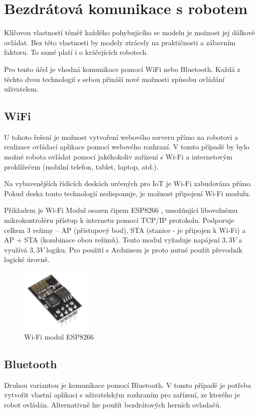 \section{Bezdrátová komunikace s robotem}
Klíčovou vlastností téměř každého pohybujícího se modelu je možnost jej dálkově ovládat. Bez této vlastnosti by modely ztrácely na praktičnosti a zábavním faktoru. To samé platí i o kráčejících robotech.

Pro tento účel je vhodná komunikace pomocí WiFi nebo Bluetooth. Každá z těchto dvou technologií s sebou přináší nové možnosti způsobu ovládání uživatelem.

\subsection*{WiFi}
U tohoto řešení je možnost vytvoření webového serveru přímo na robotovi a realizace ovládací aplikace pomocí webového rozhraní. V tomto případě by bylo možné robota ovládat pomocí jakéhokoliv zařízení s Wi-Fi a internetovým prohlížečem (mobilní telefon, tablet, laptop, atd.).

Na vybavenějších řídících deskách určených pro IoT je Wi-Fi zabudována přímo. Pokud deska touto technologií nedisponuje, je možnost připojení Wi-Fi modulu.

Příkladem je Wi-Fi Modul osazen čipem ESP8266 \cite{wifiESP}, umožňující libovolnému mikrokontroléru přístup k internetu pomocí TCP/IP protokolu. Podporuje celkem 3 režimy -- AP (přístupový bod), STA (stanice - je připojen k Wi-Fi) a AP + STA (kombinace obou režimů). Tento modul vyžaduje napájení $3,3V$ a využívá $3,3V$ logiku. Pro použití s Arduinem je proto nutné použít převodník logické úrovně.

\begin{figure}[hbt]
	\centering
	\includegraphics[width=0.3\textwidth]{obrazky-figures/esp8266.jpg}
	\caption[esp8266]{Wi-Fi modul ESP8266\footnotemark}
	\label{wifi}
\end{figure}

\subsection*{Bluetooth}
Druhou variantou je komunikace pomocí Bluetooth. V tomto případě je potřeba vytvořit vlastní aplikaci s uživatelským rozhraním pro zařízení, ze kterého je robot ovládán. Alternativně lze použít bezdrátových herních ovladačů.

